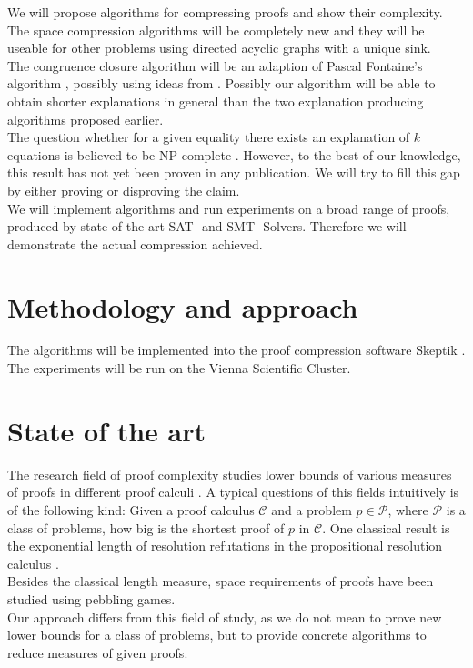 We will propose algorithms for compressing proofs and show their complexity.\\
The space compression algorithms will be completely new and they will be useable for other problems using directed acyclic graphs with a unique sink.\\
The congruence closure algorithm will be an adaption of Pascal Fontaine's algorithm \cite{TODO: Pascal's Thesis}, possibly using ideas from \cite{TODO: BarceLogic CC algorithm}. 
Possibly our algorithm will be able to obtain shorter explanations in general than the two explanation producing algorithms proposed earlier.\\
The question whether for a given equality there exists an explanation of $k$ equations is believed to be NP-complete \cite{TODO: BarceLogic CC algorithm}.
However, to the best of our knowledge, this result has not yet been proven in any publication.
We will try to fill this gap by either proving or disproving the claim.\\
We will implement algorithms and run experiments on a broad range of proofs, produced by state of the art SAT- and SMT- Solvers.
Therefore we will demonstrate the actual compression achieved.

\section{Methodology and approach}

The algorithms will be implemented into the proof compression software Skeptik \cite{TODO: Skeptik system description}.
The experiments will be run on the Vienna Scientific Cluster.

\section{State of the art}

The research field of proof complexity studies lower bounds of various measures of proofs in different proof calculi \cite{TODO: modern approach to complexity?}. A typical questions of this fields intuitively is of the following kind: Given a proof calculus $\mathcal{C}$ and a problem $p \in \mathcal{P}$, where $\mathcal{P}$ is a class of problems, how big is the shortest proof of $p$ in $\mathcal{C}$.
One classical result is the exponential length of resolution refutations in the propositional resolution calculus \cite{TODO: modern approach to complexity?}.\\
Besides the classical length measure, space requirements of proofs have been studied \cite{TODO: JAKOB NORDSTROM paper} using pebbling games.\\
Our approach differs from this field of study, as we do not mean to prove new lower bounds for a class of problems, but to provide concrete algorithms to reduce measures of given proofs.

